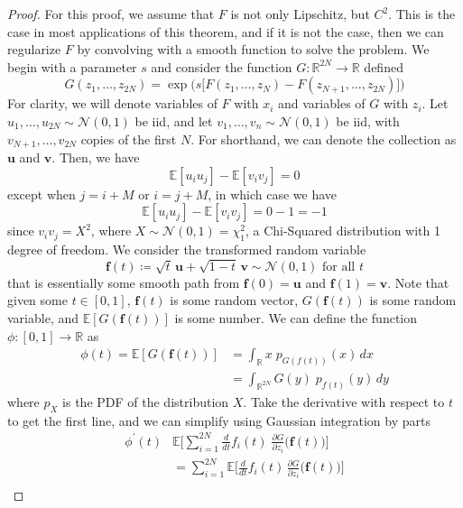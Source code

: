   \begin{proof}
  For this proof, we assume that $F$ is not only Lipschitz, but $C^2$. This is the case in most applications of this theorem, and if it is not the case, then we can regularize $F$ by convolving with a smooth function to solve the problem. We begin with a parameter $s$ and consider the function $G: \mathbb{R}^{2N} \longrightarrow \mathbb{R}$ defined 
  \[G(z_1, \ldots, z_{2N}) = \exp \Big( s \big[ F ( z_1, \ldots, z_N) - F(z_{N+1}, \ldots, z_{2N}) \big] \Big)\]
  For clarity, we will denote variables of $F$ with $x_i$ and variables of $G$ with $z_i$. Let $u_1, \ldots, u_{2N} \sim \mathcal{N}(0, 1)$ be iid, and let $v_1, \ldots, v_n \sim \mathcal{N}(0, 1)$ be iid, with $v_{N+1}, \ldots, v_{2N}$ copies of the first $N$. For shorthand, we can denote the collection as $\mathbf{u}$ and $\mathbf{v}$. Then, we have 
  \[\mathbb{E} [u_i u_j] - \mathbb{E}[ v_i v_j] = 0\]
  except when $j = i + M$ or $i = j + M$, in which case we have 
  \[\mathbb{E} [u_i u_j] - \mathbb{E}[ v_i v_j] = 0 - 1 = -1\]
  since $v_i v_j = X^2$, where $X \sim \mathcal{N}(0, 1) = \chi^2_1$, a Chi-Squared distribution with 1 degree of freedom. We consider the transformed random variable
  \[\mathbf{f}(t) \coloneqq \sqrt{t} \, \mathbf{u} + \sqrt{1 - t} \, \mathbf{v} \sim \mathcal{N}(0, 1) \text{ for all } t\]
  that is essentially some smooth path from $\mathbf{f}(0) = \mathbf{u}$ and $\mathbf{f}(1) = \mathbf{v}$. Note that given some $t \in [0, 1]$, $\mathbf{f}(t)$ is some random vector, $G ( \mathbf{f}(t))$ is some random variable, and $\mathbb{E}[ G(\mathbf{f}(t))]$ is some number. We can define the function $\phi: [0, 1] \longrightarrow \mathbb{R}$ as 
  \begin{align*}
      \phi(t) = \mathbb{E} [G (\mathbf{f}(t))] & = \int_\mathbb{R} x \; p_{G(f(t))} (x) \,dx \\
      & = \int_{\mathbb{R}^{2N}} G(y) \; p_{f(t)} (y) \,dy 
  \end{align*}
  where $p_X$ is the PDF of the distribution $X$. Take the derivative with respect to $t$ to get the first line, and we can simplify using Gaussian integration by parts 
  \begin{align*}
      \phi^\prime (t) & \mathbb{E}\bigg[ \sum_{i=1}^{2N} \frac{d}{dt} f_i (t) \; \frac{\partial G}{\partial z_i} \big( \mathbf{f}(t)\big) \bigg] \\
      & = \sum_{i=1}^{2N} \mathbb{E} \bigg[ \frac{d}{dt} f_i (t) \, \frac{\partial G}{\partial z_i} \big( \mathbf{f}(t)\big)\bigg] \\

\end{align*}
\end{proof}

